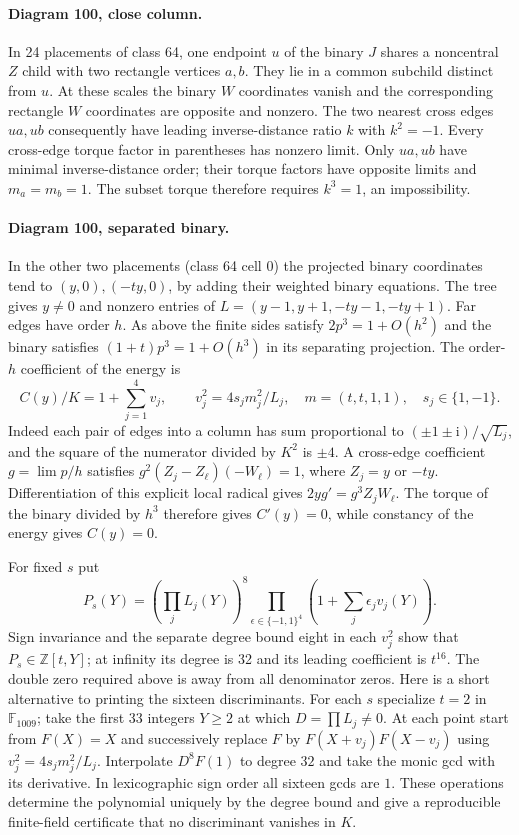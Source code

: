 \documentclass[11pt,letterpaper]{article}
\theoremstyle{definition}
\begin{document}
\paragraph{Diagram 100, close column.}
In 24 placements of class 64, one endpoint $u$ of the binary $J$
shares a noncentral $Z$ child with two rectangle vertices $a,b$.
They lie in a common subchild distinct from $u$. At these scales the
binary $W$ coordinates vanish and the corresponding rectangle $W$
coordinates are opposite and nonzero. The two nearest cross edges
$ua,ub$ consequently have leading inverse-distance ratio $k$ with
$k^2=-1$. Every cross-edge torque factor in parentheses has nonzero
limit. Only $ua,ub$ have minimal inverse-distance order; their torque
factors have opposite limits and $m_a=m_b=1$. The subset torque
therefore requires $k^3=1$, an impossibility.

\paragraph{Diagram 100, separated binary.}
In the other two placements (class 64 cell 0) the projected binary
coordinates tend to $(y,0),(-ty,0)$, by adding their weighted binary
equations. The tree gives $y\ne0$ and nonzero entries of
$L=(y-1,y+1,-ty-1,-ty+1)$. Far edges have order $h$. As above the
finite sides satisfy $2p^3=1+O(h^2)$ and the binary satisfies
$(1+t)p^3=1+O(h^3)$ in its separating projection. The order-$h$
coefficient of the energy is
\[
 C(y)/K=1+\sum_{j=1}^4 v_j,\qquad
 v_j^2=4s_jm_j^2/L_j,\quad m=(t,t,1,1),\quad s_j\in\{1,-1\}.
\]
Indeed each pair of edges into a column has sum proportional to
$(\pm1\pm\mathrm i)/\sqrt{L_j}$, and the square of the numerator
divided by $K^2$ is $\pm4$. A cross-edge coefficient $g=\lim p/h$
satisfies $g^2(Z_j-Z_\ell)(-W_\ell)=1$, where $Z_j=y$ or $-ty$.
Differentiation of this explicit local radical gives
$2yg'=g^3Z_j W_\ell$. The torque of the binary divided by $h^3$
therefore gives $C'(y)=0$, while constancy of the energy gives $C(y)=0$.

For fixed $s$ put
\[
 P_s(Y)=(\textstyle\prod_j L_j(Y))^8
 \prod_{\epsilon\in\{-1,1\}^4}\left(1+\sum_j\epsilon_jv_j(Y)\right).
\]
Sign invariance and the separate degree bound eight in each $v_j^2$
show that $P_s\in\mathbb Z[t,Y]$; at infinity its degree is 32 and its
leading coefficient is $t^{16}$. The double zero required above is away
from all denominator zeros. Here is a short alternative to printing the
sixteen discriminants. For each $s$ specialize $t=2$ in
$\mathbb F_{1009}$; take the first 33 integers $Y\ge2$ at which
$D=\prod L_j\ne0$. At each point start from $F(X)=X$ and successively
replace $F$ by $F(X+v_j)F(X-v_j)$ using $v_j^2=4s_jm_j^2/L_j$.
Interpolate $D^8F(1)$ to degree $32$ and take the monic gcd with its
derivative. In lexicographic sign order all sixteen gcds are $1$.
These operations determine the polynomial uniquely by the degree bound
and give a reproducible finite-field certificate that no discriminant
vanishes in $K$.
\end{document}
